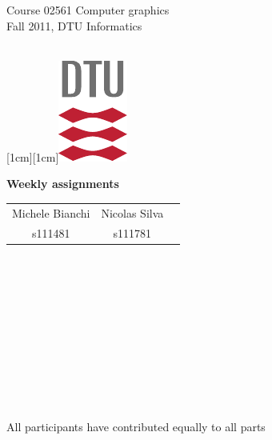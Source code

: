 \documentclass[9pt,a4paper]{scrreprt}
\begin{document}
\AddToShipoutPicture{\BackgroundPic}

\noindent\parbox[t]{9cm}{\textsf{Course 02561 Computer graphics\\
Fall 2011, DTU Informatics }}
\hfill
\parbox[t]{1cm}{\mbox{}\\
\raisebox{0.0cm}[1cm][1cm]{\includegraphics[origin=lb]{dtu_logo_cmyk.pdf}}}

\vspace{2cm}


\begin{center}
{\Large \bf Weekly assignments}\\
\vspace{0.3cm}
\vspace{1cm}
\vspace{0.3cm}
\begin{tabular}{ccc}
{\large Michele Bianchi}&{\large Nicolas Silva}\\
s111481&s111781
\end{tabular}\\
\end{center}
~\\~\\~\\~\\~\\~\\~\\~\\
\begin{center}
All participants have contributed equally to all parts
\end{center}
\newpage



\newpage

\newpage

\newpage

\newpage

\newpage

\newpage

\newpage

\newpage

\newpage
\end{document}
